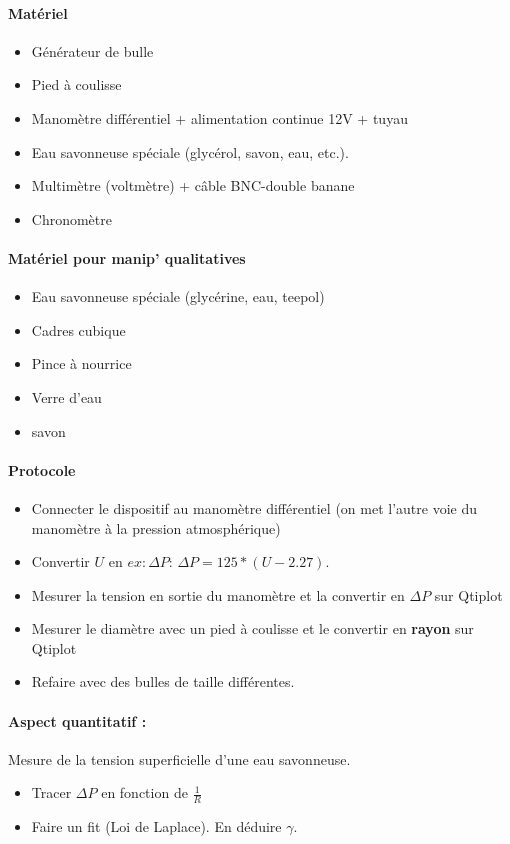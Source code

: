 \documentclass[11pt]{report}
\numberwithin{figure}{section}
\numberwithin{equation}{section}
\numberwithin{table}{section}
\newcommand{\1}{\boldsymbol{1}}
\begin{document}
\begin{tcolorbox}[breakable, enhanced, colback=red!2!white,colframe=mycolor!85!black,title=\textbf{\textbf{Expérience}}]
\paragraph*{Matériel}
\begin{itemize}
\item Générateur de bulle
\item Pied à coulisse
\item Manomètre différentiel + alimentation continue 12V + tuyau
\item Eau savonneuse spéciale (glycérol, savon, eau, etc.).
\item Multimètre (voltmètre) + câble BNC-double banane
\item Chronomètre
\end{itemize}

\paragraph*{Matériel pour manip' qualitatives}
\begin{itemize}
\item Eau savonneuse spéciale (glycérine, eau, teepol)
\item Cadres cubique
\item Pince à nourrice
\item Verre d'eau
\item savon
\end{itemize}

\paragraph*{Protocole } 

\begin{itemize}[label=$\triangleright$]
		\item Connecter le dispositif au manomètre différentiel (on met l'autre voie du manomètre à la pression atmosphérique)
		\item Convertir $U$ en $ex: \Delta P$: $\Delta P = 125*(U - 2.27)$.
		\item  Mesurer la tension en sortie du manomètre et la convertir en $\Delta P$ sur Qtiplot
		\item Mesurer le diamètre avec un pied à coulisse et le convertir en \textbf{rayon} sur Qtiplot
		\item Refaire avec des bulles de taille différentes.
\end{itemize}

\paragraph*{Aspect quantitatif :} Mesure de la tension superficielle d'une eau savonneuse.
\begin{itemize}
\item Tracer $\Delta P$ en fonction de $\frac{1}{R}$
\item Faire un fit (Loi de Laplace). En déduire $\gamma$.
\end{itemize}

\end{tcolorbox}
\end{document}
